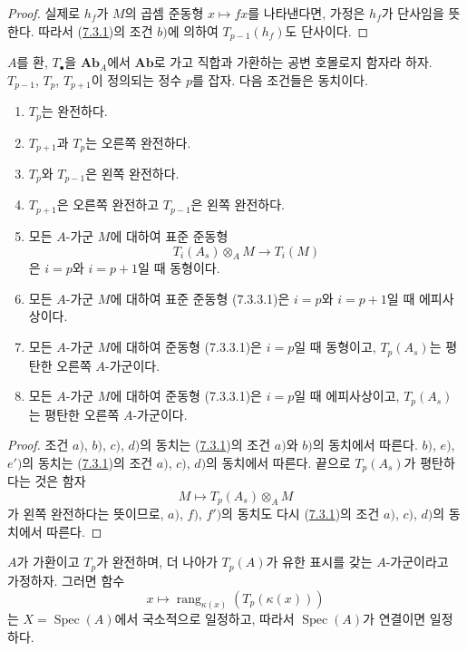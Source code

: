 \begin{proof}
실제로 $h_f$가 $M$의 곱셈 준동형 $x\mapsto fx$를 나타낸다면, 가정은
$h_f$가 단사임을 뜻한다. 따라서
(\hyperref[III.7.3.1-fr]{7.3.1})의 조건 $b)$에 의하여
$T_{p-1}(h_f)$도 단사이다.
\end{proof}

\begin{proposition}[7.3.3]
\label{III.7.3.3-fr}
$A$를 환, $T_\bullet$을 $\mathbf{Ab}_A$에서 $\mathbf{Ab}$로 가고
직합과 가환하는 공변 호몰로지 함자라 하자. $T_{p-1}$, $T_p$,
$T_{p+1}$이 정의되는 정수 $p$를 잡자. 다음 조건들은 동치이다.
\begin{enumerate}
  \item[a)] $T_p$는 완전하다.
  \item[b)] $T_{p+1}$과 $T_p$는 오른쪽 완전하다.
  \item[c)] $T_p$와 $T_{p-1}$은 왼쪽 완전하다.
  \item[d)] $T_{p+1}$은 오른쪽 완전하고 $T_{p-1}$은 왼쪽 완전하다.
  \item[e)] 모든 $A$-가군 $M$에 대하여 표준 준동형
    \[
      T_i(A_s)\otimes_A M\longrightarrow T_i(M)
      \tag{7.3.3.1}\label{III.7.3.3.1.fr}
    \]
    은 $i=p$와 $i=p+1$일 때 동형이다.
  \item[$e'$)] 모든 $A$-가군 $M$에 대하여 표준 준동형 (7.3.3.1)은
    $i=p$와 $i=p+1$일 때 에피사상이다.
  \item[f)] 모든 $A$-가군 $M$에 대하여 준동형 (7.3.3.1)은 $i=p$일
    때 동형이고, $T_p(A_s)$는 평탄한 오른쪽 $A$-가군이다.
  \item[$f'$)] 모든 $A$-가군 $M$에 대하여 준동형 (7.3.3.1)은
    $i=p$일 때 에피사상이고, $T_p(A_s)$는 평탄한 오른쪽
    $A$-가군이다.
\end{enumerate}
\end{proposition}

\begin{proof}
조건 $a)$, $b)$, $c)$, $d)$의 동치는
(\hyperref[III.7.3.1-fr]{7.3.1})의 조건 $a)$와 $b)$의 동치에서
따른다. $b)$, $e)$, $e')$의 동치는 (\hyperref[III.7.3.1-fr]{7.3.1})의
조건 $a)$, $c)$, $d)$의 동치에서 따른다. 끝으로 $T_p(A_s)$가
평탄하다는 것은 함자
\[
  M\mapsto T_p(A_s)\otimes_A M
\]
가 왼쪽 완전하다는 뜻이므로, $a)$, $f)$, $f')$의 동치도 다시
(\hyperref[III.7.3.1-fr]{7.3.1})의 조건 $a)$, $c)$, $d)$의 동치에서
따른다.
\end{proof}


\begin{corollary}[7.3.4]
\label{III.7.3.4-fr}
$A$가 가환이고 $T_p$가 완전하며, 더 나아가 $T_p(A)$가 유한 표시를
갖는 $A$-가군이라고 가정하자. 그러면 함수
\[
  x\mapsto\operatorname{rang}_{\kappa(x)}(T_p(\kappa(x)))
\]
는 $X=\operatorname{Spec}(A)$에서 국소적으로 일정하고, 따라서
$\operatorname{Spec}(A)$가 연결이면 일정하다.
\end{corollary}

